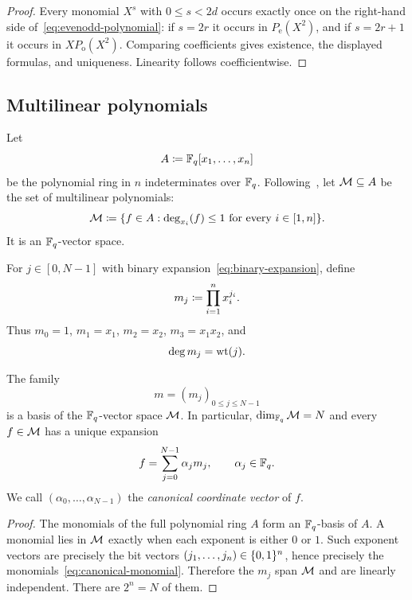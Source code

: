 \begin{proof}
Every monomial $X^s$ with $0\le s<2d$ occurs exactly once on the right-hand side of~\eqref{eq:evenodd-polynomial}: if $s=2r$ it occurs in $P_{\mathrm e}(X^2)$, and if $s=2r+1$ it occurs in $XP_{\mathrm o}(X^2)$.  Comparing coefficients gives existence, the displayed formulas, and uniqueness.  Linearity follows coefficientwise.
\end{proof}

\subsection{Multilinear polynomials}
\label{sec:preliminaries-multilinear}

Let
\[
  A\coloneqq\mathbb{F}_q[x_1,\ldots,x_n]
\]
be the polynomial ring in $n$ indeterminates over $\mathbb{F}_q$.  Following~\cite{MkhidaIguider26}, let $\mathcal{M}\subseteq A$ be the set of multilinear polynomials:
\[
  \mathcal{M}\coloneqq
  \{f\in A:\deg_{x_i}(f)\le1\text{ for every }i\in[1,n]\}.
\]
It is an $\mathbb{F}_q$-vector space.

For $j\in[0,N-1]$ with binary expansion~\eqref{eq:binary-expansion}, define
\begin{equation}
  m_j\coloneqq\prod_{i=1}^{n}x_i^{j_i}.
  \label{eq:canonical-monomial}
\end{equation}
Thus $m_0=1$, $m_1=x_1$, $m_2=x_2$, $m_3=x_1x_2$, and
\[
  \deg m_j=\operatorname{wt}(j).
\]

\begin{proposition}
\label{prop:canonical-basis}
The family
\[
  m=(m_j)_{0\le j\le N-1}
\]
is a basis of the $\mathbb{F}_q$-vector space $\mathcal{M}$.  In particular, $\dim_{\mathbb{F}_q}\mathcal{M}=N$ and every $f\in\mathcal{M}$ has a unique expansion
\begin{equation}
  f=\sum_{j=0}^{N-1}\alpha_jm_j,
  \qquad \alpha_j\in\mathbb{F}_q.
  \label{eq:canonical-expansion}
\end{equation}
We call $(\alpha_0,\ldots,\alpha_{N-1})$ the \emph{canonical coordinate vector} of $f$.
\end{proposition}

\begin{proof}
The monomials of the full polynomial ring $A$ form an $\mathbb{F}_q$-basis of $A$.  A monomial lies in $\mathcal{M}$ exactly when each exponent is either $0$ or $1$.  Such exponent vectors are precisely the bit vectors $(j_1,\ldots,j_n)\in\{0,1\}^n$, hence precisely the monomials~\eqref{eq:canonical-monomial}.  Therefore the $m_j$ span $\mathcal{M}$ and are linearly independent.  There are $2^n=N$ of them.
\end{proof}

